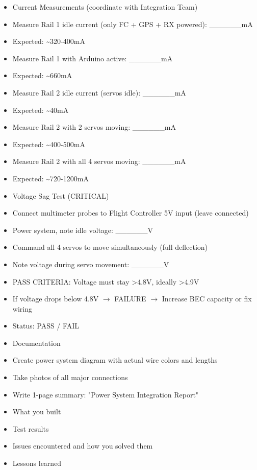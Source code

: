 \documentclass[11pt,letterpaper]{article}
\begin{document}
\begin{itemize}
  \item Current Measurements (coordinate with Integration Team)
  \item Measure Rail 1 idle current (only FC + GPS + RX powered): \_\_\_\_\_\_mA
  \item Expected: \textasciitilde{}320-400mA
  \item Measure Rail 1 with Arduino active: \_\_\_\_\_\_mA
  \item Expected: \textasciitilde{}660mA
  \item Measure Rail 2 idle current (servos idle): \_\_\_\_\_\_mA
  \item Expected: \textasciitilde{}40mA
  \item Measure Rail 2 with 2 servos moving: \_\_\_\_\_\_mA
  \item Expected: \textasciitilde{}400-500mA
  \item Measure Rail 2 with all 4 servos moving: \_\_\_\_\_\_mA
  \item Expected: \textasciitilde{}720-1200mA
\end{itemize}

\begin{itemize}
  \item Voltage Sag Test (CRITICAL)
  \item Connect multimeter probes to Flight Controller 5V input (leave connected)
  \item Power system, note idle voltage: \_\_\_\_\_\_V
  \item Command all 4 servos to move simultaneously (full deflection)
  \item Note voltage during servo movement: \_\_\_\_\_\_V
  \item PASS CRITERIA: Voltage must stay >4.8V, ideally >4.9V
  \item If voltage drops below 4.8V $\rightarrow$ FAILURE $\rightarrow$ Increase BEC capacity or fix wiring
  \item Status: PASS / FAIL
\end{itemize}

\begin{itemize}
  \item Documentation
  \item Create power system diagram with actual wire colors and lengths
  \item Take photos of all major connections
  \item Write 1-page summary: "Power System Integration Report"
  \item What you built
  \item Test results
  \item Issues encountered and how you solved them
  \item Lessons learned
\end{itemize}
\end{document}
